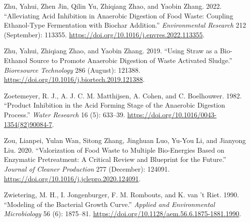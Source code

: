 \documentclass[11pt]{report}
\begin{document}
\begin{hangparas}{1.5em}{1}
\hypertarget{citeproc_bib_item_107}{Zhu, Yahui, Zhen Jin, Qilin Yu, Zhiqiang Zhao, and Yaobin Zhang. 2022. “Alleviating Acid Inhibition in Anaerobic Digestion of Food Waste: Coupling Ethanol-Type Fermentation with Biochar Addition.” \textit{Environmental Research} 212 (September): 113355. \url{https://doi.org/10.1016/j.envres.2022.113355}.}

\hypertarget{citeproc_bib_item_108}{Zhu, Yahui, Zhiqiang Zhao, and Yaobin Zhang. 2019. “Using Straw as a Bio-Ethanol Source to Promote Anaerobic Digestion of Waste Activated Sludge.” \textit{Bioresource Technology} 286 (August): 121388. \url{https://doi.org/10.1016/j.biortech.2019.121388}.}

\hypertarget{citeproc_bib_item_109}{Zoetemeyer, R. J., A. J. C. M. Matthijsen, A. Cohen, and C. Boelhouwer. 1982. “Product Inhibition in the Acid Forming Stage of the Anaerobic Digestion Process.” \textit{Water Research} 16 (5): 633–39. \url{https://doi.org/10.1016/0043-1354(82)90084-7}.}

\hypertarget{citeproc_bib_item_110}{Zou, Lianpei, Yulan Wan, Sitong Zhang, Jinghuan Luo, Yu-You Li, and Jianyong Liu. 2020. “Valorization of Food Waste to Multiple Bio-Energies Based on Enzymatic Pretreatment: A Critical Review and Blueprint for the Future.” \textit{Journal of Cleaner Production} 277 (December): 124091. \url{https://doi.org/10.1016/j.jclepro.2020.124091}.}

\hypertarget{citeproc_bib_item_111}{Zwietering, M. H., I. Jongenburger, F. M. Rombouts, and K. van ’t Riet. 1990. “Modeling of the Bacterial Growth Curve.” \textit{Applied and Environmental Microbiology} 56 (6): 1875–81. \url{https://doi.org/10.1128/aem.56.6.1875-1881.1990}.}\bigskip
\end{hangparas}
\end{document}
